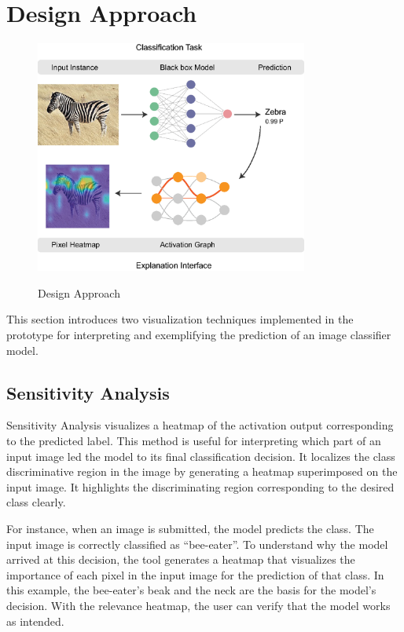 \section{Design Approach}

\begin{figure}[htbp]
\centering\textbf{}
\includegraphics[width=0.80\textwidth]{images/method-schema-copy.eps}
\caption{Design Approach}
\label{fig:design-approach}
\end{figure}

This section introduces two visualization techniques implemented in the prototype for interpreting and exemplifying the prediction of an image classifier model.

\subsection{Sensitivity Analysis}

Sensitivity Analysis visualizes a heatmap of the activation output corresponding to the predicted label. This method is useful for interpreting which part of an input image led the model to its final classification decision. It localizes the class discriminative region in the image by generating a heatmap superimposed on the input image. It highlights the discriminating region corresponding to the desired class clearly.

For instance, when an image is submitted, the model predicts the class. The input image is correctly classified as “bee-eater”. To understand why the model arrived at this decision, the tool generates a heatmap that visualizes the importance of each pixel in the input image for the prediction of that class. In this example, the bee-eater’s beak and the neck are the basis for the model’s decision. With the relevance heatmap, the user can verify that the model works as intended.

